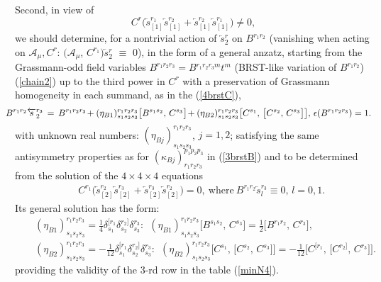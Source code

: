 \documentclass[10pt]{article}
\begin{document}
Second, in view of
\begin{equation}\label{consistC4a}
C^{r}\big(\overleftarrow{s}^{r_1}_{[1]}
\overleftarrow{s}^{r_2}_{[1]}+\overleftarrow{s}^{r_2}_{[1]}
\overleftarrow{s}^{r_1}_{[1]}\big) \ne 0,
\end{equation}
we should determine, for a nontrivial action of $\overleftarrow{s}{}^{r}_2$
on $B^{ r_1r_2}$ (vanishing when acting on $\mathcal{A}_\mu, C^r$: $\big(\mathcal{A}_\mu$, $C^{r_1}\big)\overleftarrow{s}{}^r_2$ $\equiv$ $0$), in the form of a general anzatz, starting from the  Grassmann-odd
field variables ${B}^{ r_1r_2r_3}= {B}{}^{{ r_1r_2r_3}{}m}t^m$ (BRST-like variation of $B^{r_1r_2}$) (\ref{chain2})
up to the third power in $C^r$ with a preservation of Grassmann homogeneity
in each summand, as in the (\ref{4brstC}),
\begin{eqnarray}\label{4brstB}
\hspace{-0.7em}&\hspace{-0.7em}& \hspace{-0.7em}  B^{r_1r_2} \overleftarrow{s}{}^{r_3}_2 \, = \,   {B}^{r_1r_2r_3} \hspace{-0.15em}  +  (\eta_{B1})^{r_1r_2r_3}_{s_1s_2s_3}  \big[B^{s_1s_2},\,C^{s_3}\big]\hspace{-0.15em} + (\eta_{B2})^{r_1r_2r_3}_{s_1s_2s_3}   \big[C^{s_1},\,\big[C^{s_2},\,C^{s_3}\big]\big]  ,   \,  \epsilon( {B}^{r_1r_2r_3}) = 1.
\end{eqnarray}
with unknown real numbers: $(\eta_{Bj})^{r_1r_2r_3}_{s_1s_2s_3}$, $j=1,2$;  satisfying the same antisymmetry properties as for $(\kappa_{Bj})^{p_1p_2p_3}_{r_1r_2r_3}$  in (\ref{3brstB}) and  to be determined from the solution of
the $4\times4\times 4$ equations
\begin{eqnarray}\label{consistC4}
  && C^{r_1}\big(\overleftarrow{s}{}^{r_2}_{[2]}\overleftarrow{s}{}^{r_3}_{[2]}+\overleftarrow{s}{}^{r_3}_{[2]}\overleftarrow{s}{}^{r_2}_{[2]}\big) =0, \ \mathrm{where}  \ B^{r_1r_2}\overleftarrow{s}{}^{r_3}_{l}\equiv 0,\, l=0,1.
\end{eqnarray}
Its general  solution has the form:
\begin{eqnarray}\label{solconstC4}
 && (\eta_{B1})^{r_1r_2r_3}_{s_1s_2s_3} = \frac{1}{4} \delta^{[r_1}_{s_1}\delta^{r_2]}_{s_2} \delta^{r_3}_{{s_3}}:\  \ (\eta_{B1})^{r_1r_2r_3}_{s_1s_2s_3} \big[B^{s_1s_2},\,C^{s_3}\big] = \frac{1}{2} \big[B^{r_1r_2},\,C^{r_3}\big], \\
  &&   (\eta_{B2})^{r_1r_2r_3}_{s_1s_2s_3} = -\frac{1}{12} \delta^{[r_1}_{s_1}\delta^{r_2]}_{s_2} \delta^{r_3}_{s_3}:\ \    (\eta_{B2})^{r_1r_2r_3}_{s_1s_2s_3}  \big[C^{s_1},\,\big[C^{s_2},\,C^{s_3}\big]\big] = - \frac{1}{12} \big[C^{[r_1},\,\big[C^{r_2]},\,C^{r_3}\big]\big].
\end{eqnarray}
providing the validity of the $3$-rd row in the table (\ref{minN4}).
\end{document}
